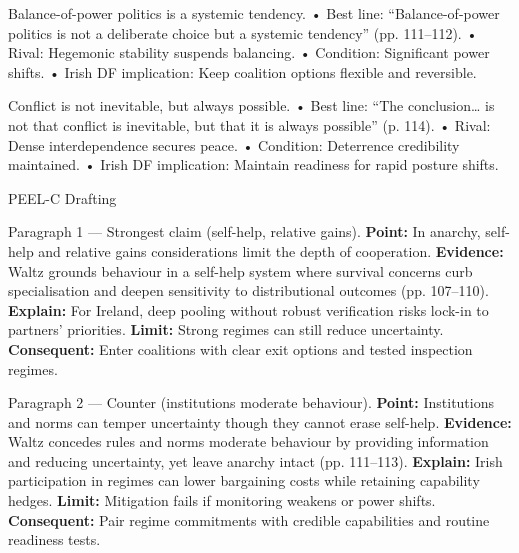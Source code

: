 Balance-of-power politics is a systemic tendency.
• Best line: “Balance-of-power politics is not a deliberate choice but a systemic tendency” (pp. 111–112).
• Rival: Hegemonic stability suspends balancing.
• Condition: Significant power shifts.
• Irish DF implication: Keep coalition options flexible and reversible.

Conflict is not inevitable, but always possible.
• Best line: “The conclusion… is not that conflict is inevitable, but that it is always possible” (p. 114).
• Rival: Dense interdependence secures peace.
• Condition: Deterrence credibility maintained.
• Irish DF implication: Maintain readiness for rapid posture shifts.

PEEL-C Drafting

Paragraph 1 — Strongest claim (self-help, relative gains).
\textbf{Point:} In anarchy, self-help and relative gains considerations limit the depth of cooperation. \textbf{Evidence:} Waltz grounds behaviour in a self-help system where survival concerns curb specialisation and deepen sensitivity to distributional outcomes (pp. 107–110). \textbf{Explain:} For Ireland, deep pooling without robust verification risks lock-in to partners’ priorities. \textbf{Limit:} Strong regimes can still reduce uncertainty. \textbf{Consequent:} Enter coalitions with clear exit options and tested inspection regimes.

Paragraph 2 — Counter (institutions moderate behaviour).
\textbf{Point:} Institutions and norms can temper uncertainty though they cannot erase self-help. \textbf{Evidence:} Waltz concedes rules and norms moderate behaviour by providing information and reducing uncertainty, yet leave anarchy intact (pp. 111–113). \textbf{Explain:} Irish participation in regimes can lower bargaining costs while retaining capability hedges. \textbf{Limit:} Mitigation fails if monitoring weakens or power shifts. \textbf{Consequent:} Pair regime commitments with credible capabilities and routine readiness tests.


